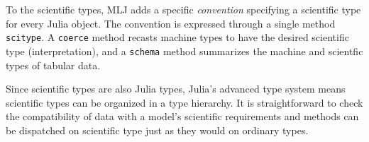 \documentclass{article}
\begin{document}
To the scientific types, MLJ adds a specific \textit{convention}
specifying a scientific type for every Julia object. The convention is
expressed through a single method \texttt{scitype}. A \texttt{coerce}
method recasts machine types to have the desired scientific type
(interpretation), and a \texttt{schema} method summarizes the machine
and scientfic types of tabular data.

    
    
    
    

    
            

Since scientific types are also Julia types, Julia's advanced type
system means scientific types can be organized in a type hierarchy.
It is straightforward to check the compatibility of data with a
model's scientific requirements and methods can be dispatched on
scientific type just as they would on ordinary types.

\end{document}
